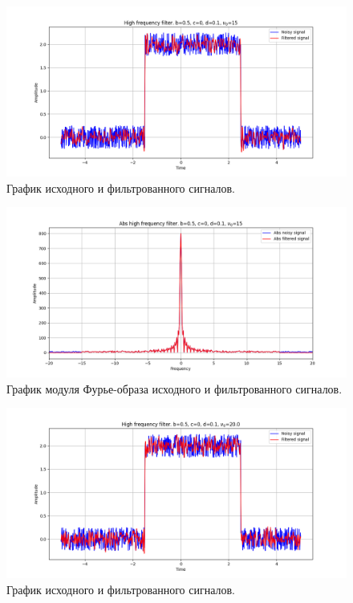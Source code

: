 \documentclass[a4paper, 12pt]{article}
\begin{document}
    \begin{figure}[!htb]
        \centering
        \includegraphics[scale=0.485]{7_u_flt_u_nohigh.png}
        \captionsetup{skip=0pt}
        \caption{График исходного и фильтрованного сигналов.}
        \label{fig:fig19}
    \end{figure}
    \begin{figure}[!htb]
        \centering
        \includegraphics[scale=0.485]{7_abs_u_U_nohigh.png}
        \captionsetup{skip=0pt}
        \caption{График модуля Фурье-образа исходного и фильтрованного сигналов.}
        \label{fig:fig20}
    \end{figure}
    \begin{figure}[!htb]
        \centering
        \includegraphics[scale=0.485]{6_u_flt_u_nohigh.png}
        \captionsetup{skip=0pt}
        \caption{График исходного и фильтрованного сигналов.}
        \label{fig:fig21}
    \end{figure}
\end{document}
